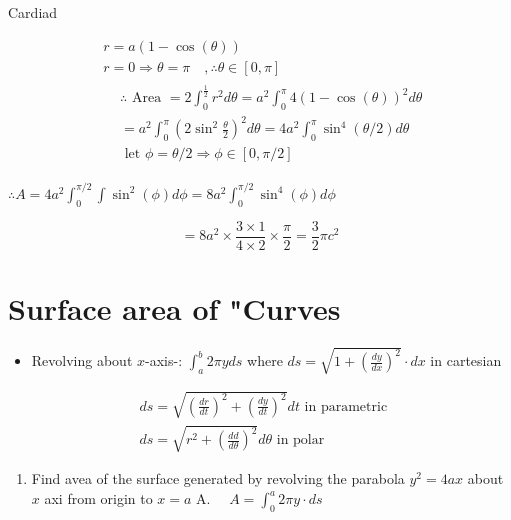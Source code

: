 \documentclass[12pt, a4paper]{article}
\begin{document}
Cardiad

$$
\begin{aligned}
& r=a(1-\cos (\theta)) \\
& r=0 \Rightarrow \theta=\pi \quad, \therefore \theta \in[0, \pi] \\
& \begin{aligned}
& \therefore \text { Area }=2 \int_{0}^{\frac{1}{2}} r^{2} d \theta= a^{2} \int_{0}^{\pi} 4(1-\cos (\theta))^{2} d \theta \\
&= a^{2} \int_{0}^{\pi}\left(2 \sin ^{2} \frac{\theta}{2}\right)^{2} d \theta=4 a^{2} \int_{0}^{\pi} \sin ^{4}(\theta / 2) d \theta \\
& \text { let } \phi=\theta / 2 \Rightarrow \phi \in[0, \pi / 2]
\end{aligned}
\end{aligned}
$$

$\therefore A=4 a^{2} \int_{0}^{\pi / 2} \int \sin ^{2}(\phi) d \phi=8 a^{2} \int_{0}^{\pi / 2} \sin ^{4}(\phi) d \phi$

$$
=8 a^{2} \times \frac{3 \times 1}{4 \times 2} \times \frac{\pi}{2}=\frac{3}{2} \pi c^{2}
$$

\section*{Surface area of "Curves}
\begin{itemize}
  \item Revolving about $x$-axis-: $\int_{a}^{b} 2 \pi y d s$ where $d s=\sqrt{1+\left(\frac{d y}{d x}\right)^{2}} \cdot d x$ in cartesian
\end{itemize}

$$
\begin{aligned}
& d s=\sqrt{\left(\frac{d r}{d t}\right)^{2}+\left(\frac{d y}{d t}\right)^{2}} d t \text { in parametric } \\
& d s=\sqrt{r^{2}+\left(\frac{d d}{d \theta}\right)^{2}} d \theta \text { in polar }
\end{aligned}
$$

\begin{enumerate}
  \item Find avea of the surface generated by revolving the parabola $y^{2}=4 a x$ about $x$ axi from origin to $x=a$ A. $\quad A=\int_{0}^{a} 2 \pi y \cdot d s$
\end{enumerate}
\end{document}
